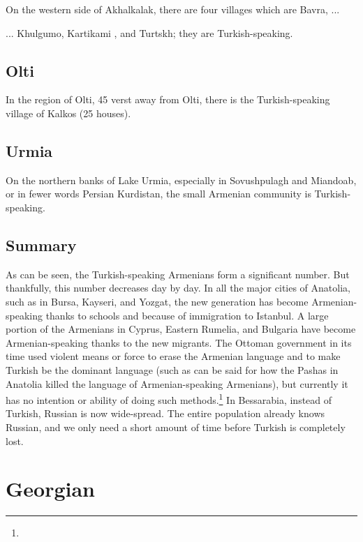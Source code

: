 On the western side of Akhalkalak, there are four villages which are Bavra, ... 



\begin{adjarianpage}\label{page:32}\end{adjarianpage}%

... Khulgumo, Kartikami , and Turtskh; they are Turkish-speaking.

\subsection{Olti}
In the region of Olti, 45 verst away from Olti, there is the Turkish-speaking village of Kalkos (25 houses).

\subsection{Urmia}
On the northern banks of Lake Urmia, especially in Sovushpulagh and Miandoab, or in fewer words Persian Kurdistan, the small Armenian community is Turkish-speaking. 

\subsection{Summary}

As can be seen, the Turkish-speaking Armenians form a significant number. But thankfully, this number decreases day by day. In all the major cities of Anatolia, such as in Bursa, Kayseri, and Yozgat, the new generation has become Armenian-speaking thanks to schools and because of immigration to Istanbul. A large portion of the Armenians in Cyprus, Eastern Rumelia, and Bulgaria have become Armenian-speaking thanks to the new migrants. The Ottoman government in its time used violent means or force to erase the Armenian language and to make Turkish be the dominant language (such as can be said for how the Pashas in Anatolia killed the language of Armenian-speaking Armenians), but currently it has no intention or ability of doing such methods.\footnote{} In Bessarabia, instead of Turkish, Russian is now wide-spread. The entire population already knows Russian, and we only need a short amount of time before Turkish is completely lost. 

\section{Georgian}

